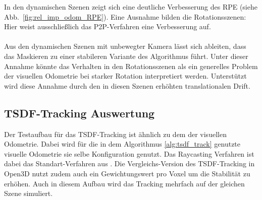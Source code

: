 \documentclass[12pt,DIV=15,BCOR=15mm,twoside,headsepline,abstract=true,listof=totoc,bibliography=totoc]{scrreprt}
\theoremstyle{remark}    %
\begin{document}
    In den dynamischen Szenen zeigt sich eine deutliche Verbesserung des \ac{RPE} (siehe Abb.~\ref{fig:rel_imp_odom_RPE}). Eine Ausnahme bilden die Rotationsszenen: 
    Hier weist ausschließlich das \ac{P2P}-Verfahren eine Verbesserung auf. \\\\
    Aus den dynamischen Szenen mit unbewegter Kamera lässt sich ableiten, dass das Maskieren zu einer stabileren Variante des Algorithmus führt.
    Unter dieser Annahme könnte das Verhalten in den Rotationsszenen als ein generelles Problem der visuellen Odometrie bei starker Rotation interpretiert werden.
    Unterstützt wird diese Annahme durch den in diesen Szenen erhöhten translationalen Drift.
    
    \subsection{TSDF-Tracking Auswertung}
    Der Testaufbau für das \ac{TSDF}-Tracking ist ähnlich zu dem der visuellen Odometrie.
    Dabei wird für die in dem Algorithmus \ref{alg:tsdf_track} genutzte visuelle Odometrie sie selbe Konfiguration genutzt. Das Raycasting Verfahren ist 
    dabei das Standart-Verfahren aus \cite{dong2023ashmodernframeworkparallel}. Die Vergleichs-Version des \ac{TSDF}-Tracking in Open3D nutzt zudem auch ein
    Gewichtungswert pro Voxel um die Stabilität zu erhöhen. Auch in diesem Aufbau wird das Tracking mehrfach auf der gleichen Szene simuliert.
    
\end{document}
